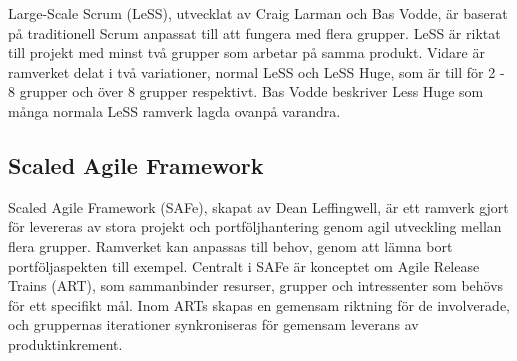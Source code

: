 	
		Large-Scale Scrum (LeSS), utvecklat av Craig Larman och Bas Vodde, är baserat på traditionell Scrum anpassat till att fungera med flera grupper. LeSS är riktat till projekt med minst två grupper som arbetar på samma produkt. Vidare är ramverket delat i två variationer, normal LeSS och LeSS Huge, som är till för 2 - 8 grupper och över 8 grupper respektivt. Bas Vodde beskriver Less Huge som många normala LeSS ramverk lagda ovanpå varandra.
		
		
		
		
		
		
		
			
	\subsection{Scaled Agile Framework}
		
		Scaled Agile Framework (SAFe), skapat av Dean Leffingwell, är ett ramverk gjort för levereras av stora projekt och portföljhantering genom agil utveckling mellan flera grupper. Ramverket kan anpassas till behov, genom att lämna bort portföljaspekten till exempel.
		Centralt i SAFe är konceptet om Agile Release Trains (ART), som sammanbinder resurser, grupper och intressenter som behövs för ett specifikt mål. Inom ARTs skapas en gemensam riktning för de involverade, och gruppernas iterationer synkroniseras för gemensam leverans av produktinkrement.
		
